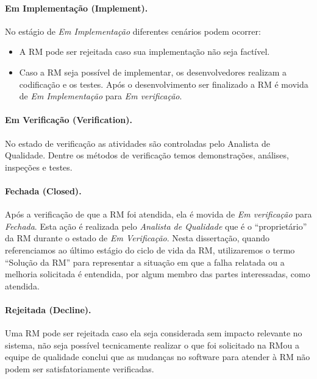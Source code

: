 \paragraph{Em Implementação (Implement).}
\label{par:em_implementacao}

No estágio de \textit{Em Implementação} diferentes cenários podem ocorrer:

\begin{itemize}
	\item A RM pode ser rejeitada caso sua implementação não seja factível.
    \item Caso a RM seja possível de implementar, os desenvolvedores realizam a
        codificação e os testes. Após o desenvolvimento ser finalizado a RM é
        movida de \textit{Em Implementação} para \textit{Em verificação}.
\end{itemize}

\paragraph{Em Verificação (Verification).}
\label{par:em_verificacao}

No estado de verificação as atividades são controladas pelo Analista de
Qualidade. Dentre os métodos de verificação temos demonstrações, análises,
inspeções e testes.

\paragraph{Fechada (Closed).}
\label{par:fechada}

Após a verificação de que a RM foi atendida, ela é movida de \textit{Em
    verificação} para \textit{Fechada}. Esta ação é realizada pelo
\textit{Analista de Qualidade} que é o ``proprietário'' da RM durante o estado
de \textit{Em Verificação}. Nesta dissertação, quando referenciamos ao último
estágio do ciclo de vida da RM, utilizaremos o termo ``Solução da RM'' para
representar a situação em que a falha relatada ou a melhoria solicitada é
entendida, por algum membro das partes interessadas, como atendida.

\paragraph{Rejeitada (Decline).}
\label{par:rejeitada}

Uma RM pode ser rejeitada caso ela seja considerada sem impacto relevante no
sistema, não seja possível tecnicamente realizar o que foi solicitado na RM\@ ou
a equipe de qualidade conclui que as mudanças no software para atender à RM não
podem ser satisfatoriamente verificadas.

